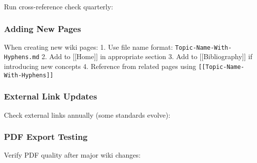 Run cross-reference check quarterly:

\begin{Shaded}
\begin{Highlighting}[]
\end{Highlighting}
\end{Shaded}

\subsubsection{Adding New Pages}\label{adding-new-pages}

When creating new wiki pages: 1. Use file name format:
\texttt{Topic-Name-With-Hyphens.md} 2. Add to {[}{[}Home{]}{]} in
appropriate section 3. Add to {[}{[}Bibliography{]}{]} if introducing
new concepts 4. Reference from related pages using
\texttt{{[}{[}Topic-Name-With-Hyphens{]}{]}}

\subsubsection{External Link Updates}\label{external-link-updates}

Check external links annually (some standards evolve):

\begin{Shaded}
\begin{Highlighting}[]
  \CommentTok{\# }
\end{Highlighting}
\end{Shaded}

\subsubsection{PDF Export Testing}\label{pdf-export-testing}

Verify PDF quality after major wiki changes:

\begin{Shaded}
\begin{Highlighting}[]
\end{Highlighting}
\end{Shaded}

